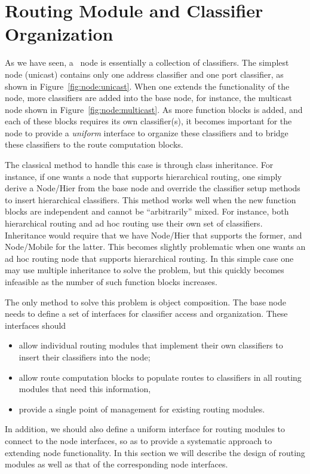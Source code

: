 \section{Routing Module and Classifier Organization}
\label{sec:node:rtarch}

As we have seen, a \ns\ node is essentially a collection of
classifiers.
The simplest node (unicast) contains only one address classifier and
one port classifier, as shown in Figure~\ref{fig:node:unicast}.
When one extends the functionality of the node, more classifiers are added
into the base node, for instance, the multicast node shown in
Figure~\ref{fig:node:multicast}.
As more function blocks is added, and each of these blocks requires
its own classifier(s), it becomes important for the node to
provide a {\em uniform} interface to organize these classifiers and to
bridge these classifiers to the route computation blocks.

The classical method to handle this case is through class
inheritance.
For instance, if one wants a node that supports hierarchical routing,
one simply derive a Node/Hier from the base node and override the
classifier setup methods to insert hierarchical classifiers.
This method works well when the new function blocks are independent
and cannot be ``arbitrarily'' mixed. 
For instance, both hierarchical routing and ad hoc routing use their
own set of classifiers. 
Inheritance would require that we have Node/Hier that supports
the former, and Node/Mobile for the latter.
This becomes slightly problematic when one wants an ad hoc routing
node that supports hierarchical routing.
In this simple case one may use multiple inheritance to solve the
problem, but this quickly becomes infeasible as the number of such
function blocks increases. 

The only method to solve this problem is object composition. 
The base node needs to define a set of interfaces for classifier
access and organization. 
These interfaces should
\begin{itemize}
\item allow individual routing modules that implement
  their own classifiers to insert their classifiers into the node;
\item allow route computation blocks to populate routes to classifiers
  in all routing modules that need this information, 
\item provide a single point of management for existing routing modules. 
\end{itemize}
In addition, we should also define a uniform interface for routing
modules to connect to the node interfaces, so as to provide a
systematic approach to extending node functionality. 
In this section we will describe the design of routing modules as well
as that of the corresponding node interfaces.


